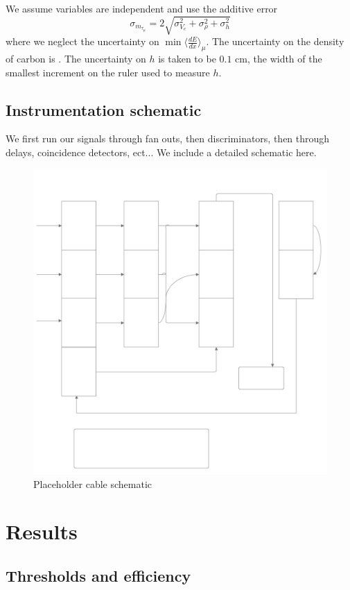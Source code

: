 \documentclass[aps,prb,twocolumn,superscriptaddress,floatfix,longbibliography,citeautoscript]{revtex4-2}
\begin{document}
We assume variables are independent and use the additive error $$\sigma_{m_{\tau_\mu}} = 2\sqrt{\sigma_{V_e}^2 + \sigma_{\rho}^2 + \sigma_{h}^2}$$ where we neglect the uncertainty on $\min\langle \frac{dE}{dx}\rangle_{\mu}$. The uncertainty on the density of carbon is . The uncertainty on $h$ is taken to be $0.1$ \si{\cm}, the width of the smallest increment on the ruler used to measure $h$.


\subsection{Instrumentation schematic}
We first run our signals through fan outs, then discriminators, then through delays, coincidence detectors, ect... We include a detailed schematic here.
\begin{figure}
    \centering
    \includegraphics[width=0.5\linewidth]{schematic.png}
    \caption{Placeholder cable schematic}
    \label{fig:schematic}
\end{figure}




\section{\label{sec:Results} Results}
\subsection{Thresholds and efficiency}

\begin{acknowledgments}
\end{acknowledgments}


\end{document}
